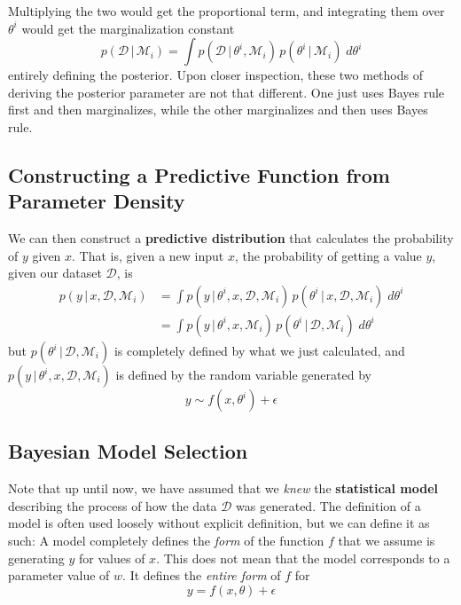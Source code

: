   Multiplying the two would get the proportional term, and integrating them over $\theta^i$ would get the marginalization constant
  \begin{equation}
    p(\mathcal{D}\,|\,\mathcal{M}_i) = \int p(\mathcal{D}\,|\,\theta^i, \mathcal{M}_i) \, p(\theta^i\,|\,\mathcal{M}_i)\; d\theta^i
  \end{equation}
  entirely defining the posterior. Upon closer inspection, these two methods of deriving the posterior parameter are not that different. One just uses Bayes rule first and then marginalizes, while the other marginalizes and then uses Bayes rule.

\subsection{Constructing a Predictive Function from Parameter Density}

  We can then construct a \textbf{predictive distribution} that calculates the probability of $y$ given $x$. That is, given a new input $x$, the probability of getting a value $y$, given our dataset $\mathcal{D}$, is
  \begin{align*}
    p(y\,|\,x, \mathcal{D}, \mathcal{M}_i) & = \int p(y\,|\,\theta^i, x, \mathcal{D}, \mathcal{M}_i) \, p(\theta^i \,|\, x, \mathcal{D}, \mathcal{M}_i)\; d\theta^i \\
    & = \int p(y\,|\,\theta^i, x, \mathcal{M}_i)\, p(\theta^i \,|\,\mathcal{D}, \mathcal{M}_i)\; d\theta^i
  \end{align*}
  but $p(\theta^i\,|\,\mathcal{D}, \mathcal{M}_i)$ is completely defined by what we just calculated, and $p(y\,|\,\theta^i, x, \mathcal{D}, \mathcal{M}_i)$ is defined by the random variable generated by
  \begin{equation}
    y \sim f(x, \theta^i) + \epsilon
  \end{equation}

\subsection{Bayesian Model Selection}

  Note that up until now, we have assumed that we \textit{knew} the \textbf{statistical model} describing the process of how the data $\mathcal{D}$ was generated. The definition of a model is often used loosely without explicit definition, but we can define it as such: A model completely defines the \textit{form} of the function $f$ that we assume is generating $y$ for values of $x$. This does not mean that the model corresponds to a parameter value of $w$. It defines the \textit{entire form} of $f$ for
  \begin{equation}
    y = f(x, \theta) + \epsilon
  \end{equation}

